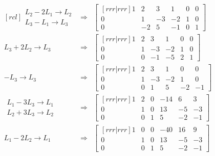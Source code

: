 \documentclass[french]{beamer}
\begin{document}
\begin{frame}
\[
\begin{matrix}[rcl]
    \begin{matrix}
    L_2 - 2 L_1 \rightarrow L_2 \\
    L_3 - L_1 \rightarrow L_3
    \end{matrix}
    &\Rightarrow&
    \begin{bmatrix}[rrr|rrr]
    1 & 2 & 3 & 1 & 0 & 0\\
    0 & 1 & -3 & -2 & 1 & 0 \\
    0 & -2 & 5 & -1 & 0 & 1
    \end{bmatrix}\\[20pt]
        L_3 + 2 L_2 \rightarrow L_3
    &\Rightarrow&
      \begin{bmatrix}[rrr|rrr]
    1 & 2 & 3 & 1 & 0 & 0\\
    0 & 1 & -3 & -2 & 1 & 0 \\
    0 & 0 & -1 & -5 & 2 & 1
    \end{bmatrix}\\[20pt]  
    -L_3 \rightarrow L_3
        &\Rightarrow&
      \begin{bmatrix}[rrr|rrr]
    1 & 2 & 3 & 1 & 0 & 0\\
    0 & 1 & -3 & -2 & 1 & 0 \\
    0 & 0 & 1 & 5 & -2 & -1
    \end{bmatrix}\\[20pt]    
    \begin{matrix}
    L_1 - 3L_3 \rightarrow L_1 \\
    L_2 + 3L_3 \rightarrow L_2
    \end{matrix}      
            &\Rightarrow&
      \begin{bmatrix}[rrr|rrr]
    1 & 2 & 0 & -14 & 6 & 3\\
    0 & 1 & 0 & 13 & -5 & -3 \\
    0 & 0 & 1 & 5 & -2 & -1
    \end{bmatrix}\\[20pt] 
     L_1 - 2 L_2 \rightarrow L_1
       &\Rightarrow&
      \begin{bmatrix}[rrr|rrr]
    1 & 0 & 0 & -40 & 16 & 9\\
    0 & 1 & 0 & 13 & -5 & -3 \\
    0 & 0 & 1 & 5 & -2 & -1
    \end{bmatrix}    
\end{matrix}
\]
\end{frame}
\end{document}

